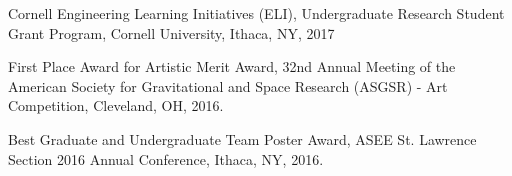 
\begin{cvitems}
\vspace{10pt}
\paragraphstyle
\item Cornell Engineering Learning Initiatives (ELI), Undergraduate Research Student Grant Program, Cornell University, Ithaca, NY, 2017
\item First Place Award for Artistic Merit Award, 32nd Annual Meeting of the American Society for Gravitational and Space Research (ASGSR) - Art Competition, Cleveland, OH, 2016.
\item Best Graduate and Undergraduate Team Poster Award, ASEE St. Lawrence Section 2016 Annual Conference, Ithaca, NY, 2016.
\end{cvitems}
\vspace{10pt}

